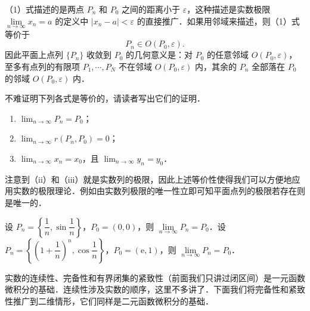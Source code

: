 （1）式描述的是两点 $P_{n}$ 和 $P_{0}$ 之间的距离小于 $\varepsilon$，这种描述是实数极限 $\lim\limits_{n\to\infty}x_{n}=a$ 的定义中 $\left|x_{n}-a\right|<\varepsilon$ 的直接推广．如果用邻域来描述，则（1）式等价于
\[
P_{n}\in O\left(P_{0},\varepsilon\right).
\]
因此平面上点列 $\{P_{n}\}$ 收敛到 $P_{0}$ 的几何意义是：对 $P_{0}$ 的任意邻域 $O(P_{0},\varepsilon)$，至多有点列的有限项 $P_{1},\cdots,P_{N}$ 不在邻域 $O(P_{0},\varepsilon)$ 内，其余的 $P_{n}$ 全部落在 $P_{0}$ 的邻域 $O(P_{0},\varepsilon)$ 内．

不难证明下列各式是等价的，请读者写出它们的证明．

\begin{enumerate}[label=(\roman*),leftmargin=3.2em,itemsep=2pt,topsep=2pt]
\item $\displaystyle\lim_{n\to\infty}P_{n}=P_{0}$；
\item $\displaystyle\lim_{n\to\infty}r(P_{n},P_{0})=0$；
\item $\displaystyle\lim_{n\to\infty}x_{n}=x_{0}$，且 $\displaystyle\lim_{n\to\infty}y_{n}=y_{0}$．
\end{enumerate}

注意到（ii）和（iii）就是实数列的极限，因此上述等价性使得我们可以方便地应用实数的极限理论．例如由实数列极限的唯一性立即可知平面点列的极限若存在则是唯一的．

\begin{figure}[htbp]
\centering
{}\caption{\relax}\label{fig:15-9}
\end{figure}

\begin{example}\label{ex:15-1-3}
设 $P_{n}=\left\{\dfrac{1}{n},\sin\dfrac{1}{n}\right\}$，$P_{0}=(0,0)$，则 $\lim\limits_{n\to\infty}P_{n}=P_{0}$．设 $P_{n}=\left\{\left(1+\dfrac{1}{n}\right)^{n},\cos\dfrac{1}{n}\right\}$，$P_{0}=(\mathrm{e},1)$，则 $\lim\limits_{n\to\infty}P_{n}=P_{0}$．
\end{example}

实数的连续性、完备性和有界闭集的紧致性（前面我们只讲过闭区间）是一元函数微积分的基础．连续性涉及实数的顺序，这里不多讲了．下面我们将完备性和紧致性推广到二维情形，它们同样是二元函数微积分的基础．

